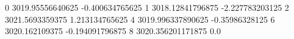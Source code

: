 0 3019.95556640625 -0.400634765625
1 3018.12841796875 -2.227783203125
2 3021.5693359375 1.213134765625
4 3019.996337890625 -0.35986328125
6 3020.162109375 -0.194091796875
8 3020.356201171875 0.0
